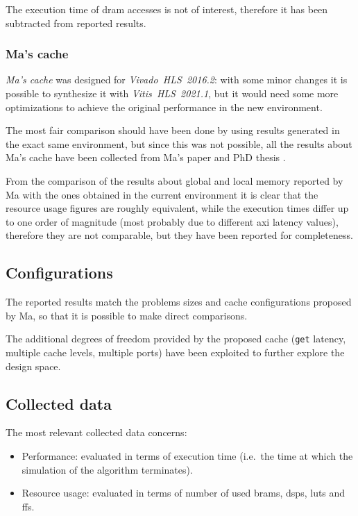 \documentclass[11pt,a4paper,oneside]{memoir}
\begin{document}
The execution time of \ac{dram} accesses is not of interest, therefore it has
been subtracted from reported results.

\subsubsection{Ma's cache}
\emph{Ma's cache} was designed for \emph{Vivado\texttrademark~HLS~2016.2}:
with some minor changes it is possible to synthesize it with
\emph{Vitis~HLS~2021.1}, but it would need some more optimizations to achieve
the original performance in the new environment.

The most fair comparison should have been done by using results generated in
the exact same environment, but since this was not possible, all the results
about Ma's cache have been collected from Ma's paper  and PhD
thesis .

From the comparison of the results about global and local memory reported by Ma
with the ones obtained in the current environment it is clear that the resource
usage figures are roughly equivalent, while the execution times differ up to
one order of magnitude (most probably due to different \ac{axi} latency
values), therefore they are not comparable, but they have been reported for
completeness.

\subsection{Configurations}
The reported results match the problems sizes and cache configurations proposed
by Ma, so that it is possible to make direct comparisons.

The additional degrees of freedom provided by the proposed cache (\texttt{get}
latency, multiple cache levels, multiple ports) have been exploited to further
explore the design space.

\subsection{Collected data}
The most relevant collected data concerns:
\begin{itemize}
	\item Performance: evaluated in terms of execution time (i.e.\ the time
		at which the simulation of the algorithm terminates).
	\item Resource usage: evaluated in terms of number of used \acp{bram},
		\acp{dsp}, \acp{lut} and \acp{ff}.
\end{itemize}
\end{document}
